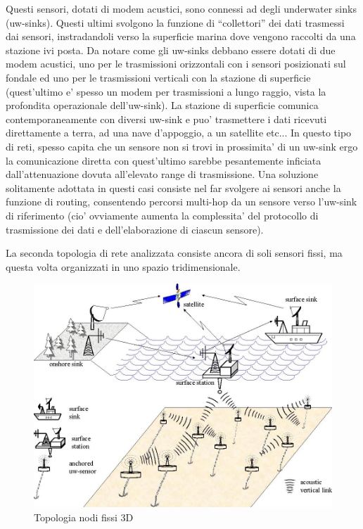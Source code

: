 Questi sensori, dotati di modem acustici, sono connessi ad degli underwater sinks (uw-sinks). Questi ultimi svolgono la funzione di ``collettori'' dei dati trasmessi dai sensori, instradandoli verso la superficie marina dove vengono raccolti da una stazione ivi posta. Da notare come gli uw-sinks debbano essere dotati di due modem acustici, uno per le trasmissioni orizzontali con i sensori posizionati sul fondale ed uno per le trasmissioni verticali con la stazione di superficie (quest'ultimo e' spesso un modem per trasmissioni a lungo raggio, vista la profondita operazionale dell'uw-sink). \newline La stazione di superficie comunica contemporaneamente con diversi uw-sink e puo' trasmettere i dati ricevuti direttamente a terra, ad una nave d'appoggio, a un satellite etc... \newline
In questo tipo di reti, spesso capita che un sensore non si trovi in prossimita' di un uw-sink ergo la comunicazione diretta con quest'ultimo sarebbe pesantemente inficiata dall'attenuazione dovuta all'elevato range di trasmissione. Una soluzione solitamente adottata in questi casi consiste nel far svolgere ai sensori anche la funzione di routing, consentendo percorsi multi-hop da un sensore verso l'uw-sink di riferimento (cio' ovviamente aumenta la complessita' del protocollo di trasmissione dei dati e dell'elaborazione di ciascun sensore).

La seconda topologia di rete analizzata consiste ancora di soli sensori fissi, ma questa volta organizzati in uno spazio tridimensionale.

\begin{figure}[H]
    \centering
	\includegraphics[scale=0.3]{3D_arch.jpg}
	\caption{ Topologia nodi fissi 3D}
	\label{fig:}
\end{figure}

